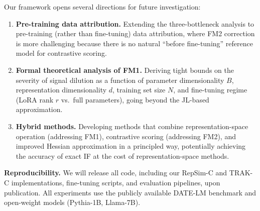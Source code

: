 \documentclass{article}
\begin{document}
Our framework opens several directions for future investigation:

\begin{enumerate}
    \item \textbf{Pre-training data attribution.} Extending the three-bottleneck analysis to pre-training (rather than fine-tuning) data attribution, where FM2 correction is more challenging because there is no natural ``before fine-tuning'' reference model for contrastive scoring.

    \item \textbf{Formal theoretical analysis of FM1.} Deriving tight bounds on the severity of signal dilution as a function of parameter dimensionality $B$, representation dimensionality $d$, training set size $N$, and fine-tuning regime (LoRA rank $r$ vs.\ full parameters), going beyond the JL-based approximation.

    \item \textbf{Hybrid methods.} Developing methods that combine representation-space operation (addressing FM1), contrastive scoring (addressing FM2), and improved Hessian approximation in a principled way, potentially achieving the accuracy of exact IF at the cost of representation-space methods.
\end{enumerate}

\textbf{Reproducibility.} We will release all code, including our RepSim-C and TRAK-C implementations, fine-tuning scripts, and evaluation pipelines, upon publication. All experiments use the publicly available DATE-LM benchmark and open-weight models (Pythia-1B, Llama-7B).



\end{document}
